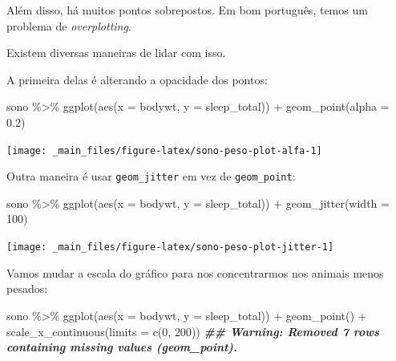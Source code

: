 \documentclass[
  11pt]{report}
\newenvironment{Shaded}{\begin{snugshade}}{\end{snugshade}}
\newcommand{\AttributeTok}[1]{\textcolor[rgb]{0.77,0.63,0.00}{#1}}
\newcommand{\DecValTok}[1]{\textcolor[rgb]{0.00,0.00,0.81}{#1}}
\newcommand{\DocumentationTok}[1]{\textcolor[rgb]{0.56,0.35,0.01}{\textbf{\textit{#1}}}}
\newcommand{\FloatTok}[1]{\textcolor[rgb]{0.00,0.00,0.81}{#1}}
\newcommand{\FunctionTok}[1]{\textcolor[rgb]{0.00,0.00,0.00}{#1}}
\newcommand{\NormalTok}[1]{#1}
\newcommand{\SpecialCharTok}[1]{\textcolor[rgb]{0.00,0.00,0.00}{#1}}
\begin{document}
Além disso, há muitos pontos sobrepostos. Em bom português, temos um problema de \emph{overplotting}.

Existem diversas maneiras de lidar com isso.

A primeira delas é alterando a opacidade dos pontos:

\begin{Shaded}
\begin{Highlighting}[]
\NormalTok{sono }\SpecialCharTok{\%\textgreater{}\%} 
  \FunctionTok{ggplot}\NormalTok{(}\FunctionTok{aes}\NormalTok{(}\AttributeTok{x =}\NormalTok{ bodywt, }\AttributeTok{y =}\NormalTok{ sleep\_total)) }\SpecialCharTok{+}
    \FunctionTok{geom\_point}\NormalTok{(}\AttributeTok{alpha =} \FloatTok{0.2}\NormalTok{)}
\end{Highlighting}
\end{Shaded}

\begin{center}\texttt{[image: \_main\_files/figure-latex/sono-peso-plot-alfa-1]} \end{center}

Outra maneira é usar \texttt{geom\_jitter} em vez de \texttt{geom\_point}:

\begin{Shaded}
\begin{Highlighting}[]
\NormalTok{sono }\SpecialCharTok{\%\textgreater{}\%} 
  \FunctionTok{ggplot}\NormalTok{(}\FunctionTok{aes}\NormalTok{(}\AttributeTok{x =}\NormalTok{ bodywt, }\AttributeTok{y =}\NormalTok{ sleep\_total)) }\SpecialCharTok{+}
    \FunctionTok{geom\_jitter}\NormalTok{(}\AttributeTok{width =} \DecValTok{100}\NormalTok{)}
\end{Highlighting}
\end{Shaded}

\begin{center}\texttt{[image: \_main\_files/figure-latex/sono-peso-plot-jitter-1]} \end{center}

Vamos mudar a escala do gráfico para nos concentrarmos nos animais menos pesados:

\begin{Shaded}
\begin{Highlighting}[]
\NormalTok{sono }\SpecialCharTok{\%\textgreater{}\%} 
  \FunctionTok{ggplot}\NormalTok{(}\FunctionTok{aes}\NormalTok{(}\AttributeTok{x =}\NormalTok{ bodywt, }\AttributeTok{y =}\NormalTok{ sleep\_total)) }\SpecialCharTok{+}
    \FunctionTok{geom\_point}\NormalTok{() }\SpecialCharTok{+}
    \FunctionTok{scale\_x\_continuous}\NormalTok{(}\AttributeTok{limits =} \FunctionTok{c}\NormalTok{(}\DecValTok{0}\NormalTok{, }\DecValTok{200}\NormalTok{))}
\DocumentationTok{\#\# Warning: Removed 7 rows containing missing values (geom\_point).}
\end{Highlighting}
\end{Shaded}
\end{document}
